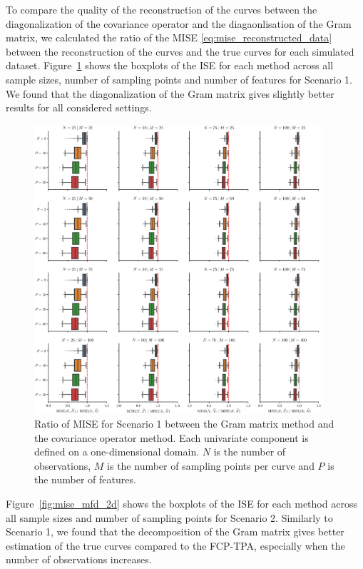 \begin{results}
To compare the quality of the reconstruction of the curves between the diagonalization of the covariance operator and the diagaonlisation of the Gram matrix, we calculated the ratio of the MISE \eqref{eq:mise_reconstructed_data} between the reconstruction of the curves and the true curves for each simulated dataset.
Figure~\ref{fig:mise_mfd_1d} shows the boxplots of the ISE for each method across all sample sizes, number of sampling points and number of features for Scenario 1. We found that the diagonalization of the Gram matrix gives slightly better results for all considered settings.
\begin{figure}
     \centering
     \includegraphics[width=0.95\textwidth]{figures/scenario_1/mise.eps}
    \caption{Ratio of MISE for Scenario 1 between the Gram matrix method and the covariance operator method. Each univariate component is defined on a one-dimensional domain. $N$ is the number of observations, $M$ is the number of sampling points per curve and $P$ is the number of features.}
    \label{fig:mise_mfd_1d}
\end{figure}
Figure~\ref{fig:mise_mfd_2d} shows the boxplots of the ISE for each method across all sample sizes and number of sampling points for Scenario 2. Similarly to Scenario 1, we found that the decomposition of the Gram matrix gives better estimation of the true curves compared to the FCP-TPA, especially when the number of observations increases.

\end{results}
